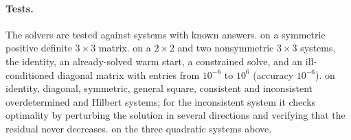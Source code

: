 \documentclass[main.tex]{subfiles}
\begin{document}
    \paragraph{Tests.}
    The solvers are tested against systems with known answers.  on a symmetric positive definite $3\times 3$ matrix.  on a $2\times 2$ and two nonsymmetric $3\times 3$ systems, the identity, an already-solved warm start, a constrained solve, and an ill-conditioned diagonal matrix with entries from $10^{-6}$ to $10^{6}$ (accuracy $10^{-6}$).  on identity, diagonal, symmetric, general square, consistent and inconsistent overdetermined and Hilbert systems; for the inconsistent system it checks optimality by perturbing the solution in several directions and verifying that the residual never decreases.  on the three quadratic systems above.
\end{document}
